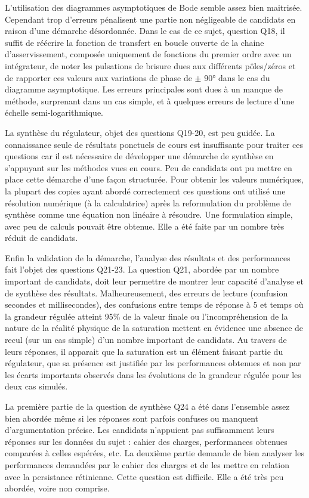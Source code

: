 \documentclass[10pt,fleqn]{article} %
\begin{document}
L’utilisation des diagrammes asymptotiques de Bode semble assez bien maitrisée. Cependant trop
d’erreurs pénalisent une partie non négligeable de candidats en raison d’une démarche désordonnée.
Dans le cas de ce sujet, question Q18, il suffit de réécrire la fonction de transfert en boucle
ouverte de la chaine d’asservissement, composée uniquement de fonctions du premier ordre avec
un intégrateur, de noter les pulsations de brisure dues aux différents pôles/zéros et de rapporter
ces valeurs aux variations de phase de $\pm$ 90° dans le cas du diagramme asymptotique. Les erreurs
principales sont dues à un manque de méthode, surprenant dans un cas simple, et à quelques
erreurs de lecture d’une échelle semi-logarithmique.

La synthèse du régulateur, objet des questions Q19-20, est peu guidée. La connaissance seule
de résultats ponctuels de cours est insuffisante pour traiter ces questions car il est nécessaire
de développer une démarche de synthèse en s’appuyant sur les méthodes vues en cours. Peu de
candidats ont pu mettre en place cette démarche d’une façon structurée. Pour obtenir les valeurs
numériques, la plupart des copies ayant abordé correctement ces questions ont utilisé une résolution
numérique (à la calculatrice) après la reformulation du problème de synthèse comme une équation
non linéaire à résoudre. Une formulation simple, avec peu de calculs pouvait être obtenue. Elle a
été faite par un nombre très réduit de candidats.

Enfin la validation de la démarche, l’analyse des résultats et des performances fait l’objet des
questions Q21-23. La question Q21, abordée par un nombre important de candidats, doit leur
permettre de montrer leur capacité d’analyse et de synthèse des résultats. Malheureusement, des
erreurs de lecture (confusion secondes et millisecondes), des confusions entre temps de réponse à 5%
et temps où la grandeur régulée atteint 95\% de la valeur finale ou l’incompréhension de la nature
de la réalité physique de la saturation mettent en évidence une absence de recul (sur un cas simple)
d’un nombre important de candidats. Au travers de leurs réponses, il apparait que la saturation est
un élément faisant partie du régulateur, que sa présence est justifiée par les performances obtenues
et non par les écarts importants observés dans les évolutions de la grandeur régulée pour les deux
cas simulés.

La première partie de la question de synthèse Q24 a été dans l’ensemble assez bien abordée même si
les réponses sont parfois confuses ou manquent d’argumentation précise. Les candidats n’appuient
pas suffisamment leurs réponses sur les données du sujet : cahier des charges, performances obtenues
comparées à celles espérées, etc. La deuxième partie demande de bien analyser les performances
demandées par le cahier des charges et de les mettre en relation avec la persistance rétinienne.
Cette question est difficile. Elle a été très peu abordée, voire non comprise.



%
\end{document}
